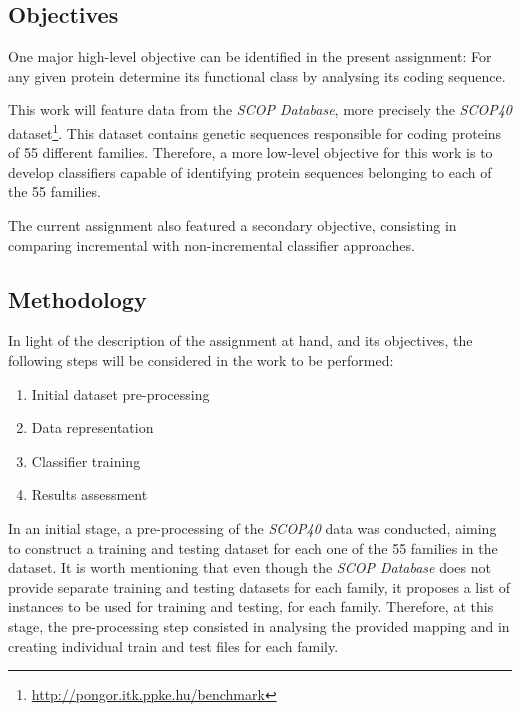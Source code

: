 \documentclass[11pt]{article}
\begin{document}
\subsection{Objectives}

One major high-level objective can be identified in the present assignment: For any given protein determine its functional class by analysing its coding sequence.

This work will feature data from the \emph{SCOP Database}\cite{murzin1995scop}, more precisely the \emph{SCOP40} dataset\footnote{\url{http://pongor.itk.ppke.hu/benchmark}}. This dataset contains genetic sequences responsible for coding proteins of 55 different families. Therefore, a more low-level objective for this work is to develop classifiers capable of identifying protein sequences belonging to each of the 55 families.

The current assignment also featured a secondary objective, consisting in comparing incremental with non-incremental classifier approaches. 

\subsection{Methodology}
\label{methodology}

In light of the description of the assignment at hand, and its objectives, the following steps will be considered in the work to be performed:

\begin{enumerate}
	\item Initial dataset pre-processing
	
	\item Data representation
	
	\item Classifier training
	
	\item Results assessment
\end{enumerate}

In an initial stage, a pre-processing of the \emph{SCOP40} data was conducted, aiming to construct a training and testing dataset for each one of the 55 families in the dataset. It is worth mentioning that even though the \emph{SCOP Database} does not provide separate training and testing datasets for each family, it proposes a list of instances to be used for training and testing, for each family. Therefore, at this stage, the pre-processing step consisted in analysing the provided mapping and in creating individual train and test files for each family.
\end{document}
